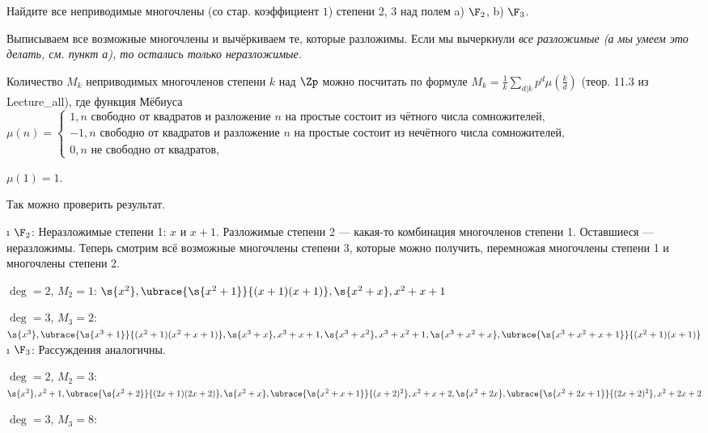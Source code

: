 \begin{problem}[44 (11.2)]
Найдите все неприводимые многочлены (со стар. коэффициент $1$) степени $2$, $3$ над полем a) $\F_2$, b) $\F_3$.
\end{problem}

\begin{solution}
Выписываем все возможные многочлены и вычёркиваем те, которые разложимы. Если мы вычеркнули \it{все} разложимые (а мы умеем это делать, см. пункт а), то остались только неразложимые. 

Количество $M_k$ неприводимых многочленов степени $k$ над $\Zp$ можно посчитать по формуле $M_k = \frac{1}{k} \sum\limits_{d|k} p^d \mu(\frac{k}{d})$ (теор. 11.3 из Lecture\_all), где функция Мёбиуса \\
$\mu(n) = 
	\begin{cases} 
		1, \text{$n$ свободно от квадратов и разложение $n$ на простые состоит из чётного числа сомножителей}, \\
		-1, \text{$n$ свободно от квадратов и разложение $n$ на простые состоит из нечётного числа сомножителей}, \\
		0, \text{$n$ не свободно от квадратов},
	\end{cases}$

$\mu(1) = 1$.

Так можно проверить результат.

\begin{enumerate}[label=\asbuk{enumi})]
\i
  \(\F_2\):
  Неразложимые степени 1: $x$ и $x+1$. Разложимые степени 2 --- какая-то комбинация многочленов степени 1. Оставшиеся --- неразложимы. Теперь смотрим всё возможные многочлены степени 3, которые можно получить, перемножая многочлены степени 1 и многочлены степени 2.

  \(\deg=2\), $M_2=1$: \(\s{x^2}, \ubrace{\s{x^2+1}}{(x+1)(x+1)}, \s{x^2+x}, x^2+x+1\)

  \(\deg=3\), $M_3=2$: \(\s{x^3}, \ubrace{\s{x^3+1}}{(x^2+1)(x^2+x+1)}, \s{x^3+x}, x^3+x+1, \s{x^3+x^2}, x^3+x^2+1, \s{x^3+x^2+x}, \ubrace{\s{x^3+x^2+x+1}}{(x^2+1)(x+1)}\)
\i
  \(\F_3\):
  Рассуждения аналогичны.

  \(\deg=2\), $M_2=3$: \(\s{x^2}, x^2+1, \ubrace{\s{x^2+2}}{(2x+1)(2x+2)}, \s{x^2+x}, \ubrace{\s{x^2+x+1}}{(x+2)^2}, x^2+x+2, \s{x^2+2x}, \ubrace{\s{x^2+2x+1}}{(2x+2)^2}, x^2+2x+2\)

  \(\deg=3\), $M_3=8$: 
  

\end{enumerate}
\end{solution}
